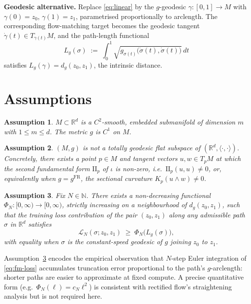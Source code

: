 \documentclass[11pt]{article}
\newtheorem{assumption}{Assumption}
\begin{document}
\medskip
\noindent\textbf{Geodesic alternative.}
Replace \eqref{eq:linear} by the $g$-geodesic
$\gamma : [0,1] \to M$ with $\gamma(0)=z_0$, $\gamma(1)=z_1$,
parametrised proportionally to arclength. The corresponding
flow-matching target becomes the geodesic tangent
$\dot\gamma(t) \in T_{\gamma(t)} M$, and the path-length functional
\[
  L_g(\sigma) \;:=\; \int_0^1 \sqrt{g_{\sigma(t)}\bigl(\dot\sigma(t),
  \dot\sigma(t)\bigr)}\, dt
\]
satisfies $L_g(\gamma) = d_g(z_0, z_1)$, the intrinsic distance.

\section*{Assumptions}

\begin{assumption}\label{ass:smooth}
$M \subset \mathbb{R}^d$ is a $C^2$-smooth, embedded submanifold of
dimension $m$ with $1 \le m \le d$. The metric $g$ is $C^1$ on $M$.
\end{assumption}

\begin{assumption}\label{ass:curved}
$(M,g)$ is \emph{not} a totally geodesic flat subspace of
$(\mathbb{R}^d, \langle\cdot,\cdot\rangle)$. Concretely, there exists
a point $p \in M$ and tangent vectors $u,w \in T_p M$ at which the
second fundamental form $\mathrm{II}_p$ of $\iota$ is non-zero, i.e.\
$\mathrm{II}_p(u,u) \neq 0$, or, equivalently when $g = g^{\mathrm{FR}}$,
the sectional curvature $K_p(u \wedge w) \neq 0$.
\end{assumption}

\begin{assumption}\label{ass:loss-arclength}
Fix $N \in \mathbb{N}$. There exists a non-decreasing functional
$\Phi_N : [0,\infty) \to [0,\infty)$, strictly increasing on a
neighbourhood of $d_g(z_0, z_1)$, such that the training loss
contribution of the pair $(z_0, z_1)$ along any admissible path
$\sigma$ in $\mathbb{R}^d$ satisfies
\begin{equation}\label{eq:loss-arc}
  \mathcal{L}_N(\sigma; z_0, z_1) \;\ge\; \Phi_N\bigl( L_g(\sigma) \bigr),
\end{equation}
with equality when $\sigma$ is the constant-speed geodesic of $g$
joining $z_0$ to $z_1$.
\end{assumption}

\noindent
Assumption~\ref{ass:loss-arclength} encodes the empirical observation
that $N$-step Euler integration of \eqref{eq:fm-loss} accumulates
truncation error proportional to the path's $g$-arclength: shorter
paths are easier to approximate at fixed compute. A precise quantitative
form (e.g.\ $\Phi_N(\ell) = c_N \ell^2$) is consistent with rectified
flow's straightening analysis but is not required here.
\end{document}

